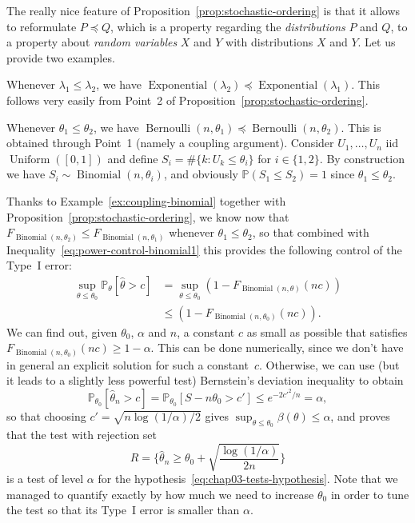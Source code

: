 \documentclass[
	fontsize=11pt, %
	twoside=false, %
	numbers=noenddot, %
]{kaobook}
\DeclareMathOperator{\ber}{Bernoulli}
\DeclareMathOperator{\bin}{Binomial}
\DeclareMathOperator{\expo}{Exponential}
\DeclareMathOperator{\uni}{Uniform}
\renewcommand{\P}{\mathbb P}
\newcommand{\wh}{\widehat}
\newcommand{\lest}{\preceq}
\begin{document}
The really nice feature of Proposition~\ref{prop:stochastic-ordering} is that it allows to reformulate $P \lest Q$, which is a property regarding the \emph{distributions} $P$ and $Q$, to a property about \emph{random variables} $X$ and $Y$ with distributions $X$ and $Y$.
Let us provide two examples.
\begin{example}
	Whenever $\lambda_1 \leq \lambda_2$, we have $\expo(\lambda_2) \lest \expo(\lambda_1)$. This follows very easily from Point~2 of Proposition~\ref{prop:stochastic-ordering}.
\end{example}
\begin{example}
	\label{ex:coupling-binomial}
	Whenever $\theta_1 \leq \theta_2$, we have $\ber(n, \theta_1) \lest \ber(n, \theta_2)$. This is obtained through Point~1 (namely a coupling argument).
	Consider $U_1, \ldots, U_n$ iid $\uni([0, 1])$ and define $S_i = \# \{ k : U_k \leq \theta_i \}$ for $i \in \{ 1, 2 \}$. By construction we have $S_i \sim \bin(n, \theta_i)$, and obviously $\P(S_1 \leq S_2) = 1$ since $\theta_1 \leq \theta_2$.
\end{example}
Thanks to Example~\ref{ex:coupling-binomial} together with Proposition~\ref{prop:stochastic-ordering}, we know now that $F_{\bin(n, \theta_2)} \leq F_{\bin(n, \theta_1)}$ whenever $\theta_1 \leq \theta_2$, so that combined with Inequality~\eqref{eq:power-control-binomial1} this provides the following control of the Type~I error:
\begin{align*}
	\sup_{\theta \leq \theta_0} \P_\theta[ \wh \theta > c] &= \sup_{\theta \leq \theta_0} (1 - F_{\bin(n, \theta)}(n c))\\
	& \leq (1 - F_{\bin(n, \theta_0)}(n c)).
\end{align*}
We can find out, given $\theta_0$, $\alpha$ and $n$, a constant $c$ as small as possible that satisfies $F_{\bin(n, \theta_0)}(n c) \geq 1 - \alpha$.
This can be done numerically, since we don't have in general an explicit solution for such a constant~$c$.
Otherwise, we can use (but it leads to a slightly less powerful test) Bernstein's deviation inequality to obtain
\begin{equation*}
	\P_{\theta_0} [\wh \theta_n > c] = \P_{\theta_0}[S - n \theta_0 > c'] \leq e^{-2 c'^2 / n} = \alpha,
\end{equation*}
so that choosing $c' = \sqrt{n \log(1 / \alpha) / 2}$ gives $\sup_{\theta \leq \theta_0} \beta(\theta) \leq \alpha$, and proves that the test with rejection set 
\begin{equation*}
	R = \bigg\{ \wh \theta_n \geq \theta_0 + \sqrt{ \frac{\log(1 / \alpha)}{2n}} \bigg\}
\end{equation*}
is a test of level $\alpha$ for the hypothesis~\eqref{eq:chap03-tests-hypothesis}.
Note that we managed to quantify exactly by how much we need to increase $\theta_0$ in order to tune the test so that its Type~I error is smaller than $\alpha$.
\end{document}
